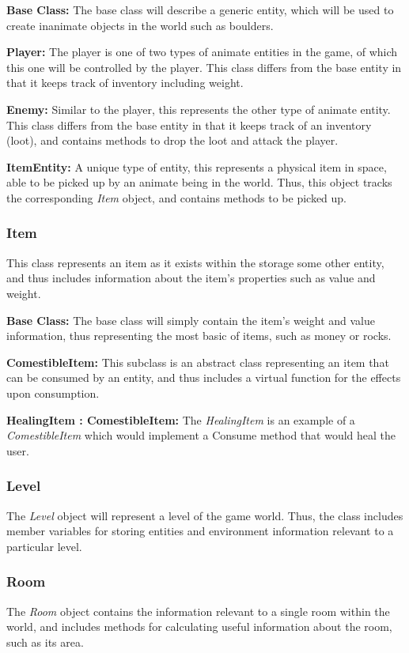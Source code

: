 \documentclass{article}
\begin{document}
\textbf{Base Class:} The base class will describe a generic entity, which will be used to create inanimate objects in the world such as boulders.

\textbf{Player:} The player is one of two types of animate entities in the game, of which this one will be controlled by the player. This class differs from the base entity in that it keeps track of inventory including weight.

\textbf{Enemy:} Similar to the player, this represents the other type of animate entity. This class differs from the base entity in that it keeps track of an inventory (loot), and contains methods to drop the loot and attack the player.

\textbf{ItemEntity:} A unique type of entity, this represents a physical item in space, able to be picked up by an animate being in the world. Thus, this object tracks the corresponding \textit{Item} object, and contains methods to be picked up.
\subsubsection{Item}
This class represents an item as it exists within the storage some other entity, and thus includes information about the item's properties such as value and weight.

\textbf{Base Class:} The base class will simply contain the item's weight and value information, thus representing the most basic of items, such as money or rocks.

\textbf{ComestibleItem:} This subclass is an abstract class representing an item that can be consumed by an entity, and thus includes a virtual function for the effects upon consumption.

\textbf{HealingItem : ComestibleItem:} The \textit{HealingItem} is an example of a \textit{ComestibleItem} which would implement a Consume method that would heal the user.
\subsubsection{Level}
The \textit{Level} object will represent a level of the game world. Thus, the class includes member variables for storing entities and environment information relevant to a particular level.
\subsubsection{Room}
The \textit{Room} object contains the information relevant to a single room within the world, and includes methods for calculating useful information about the room, such as its area.
\end{document}
